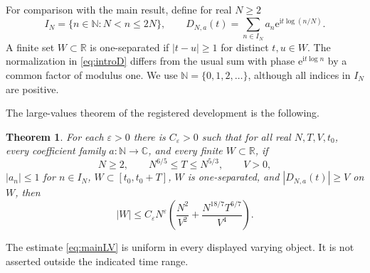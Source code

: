 \documentclass[11pt,a4paper,oneside]{article}
\newtheorem{theorem}{Theorem}[section]
\theoremstyle{definition}
\newcommand{\R}{\mathbb R}
\newcommand{\C}{\mathbb C}
\newcommand{\N}{\mathbb N}
\newcommand{\eps}{\varepsilon}
\newcommand{\ii}{\mathrm i}
\newcommand{\e}{\mathrm e}
\numberwithin{equation}{section}
\begin{document}
For comparison with the main result, define for real $N\ge2$
\begin{equation}\label{eq:introD}
 I_N=\{n\in\N:N<n\le2N\},\qquad
 D_{N,a}(t)=\sum_{n\in I_N}a_n\e^{\ii t\log(n/N)}.
\end{equation}
A finite set $W\subset\R$ is one-separated if $|t-u|\ge1$ for distinct $t,u\in W$. The normalization in \eqref{eq:introD} differs from the usual sum with phase $\e^{\ii t\log n}$ by a common factor of modulus one. We use $\N=\{0,1,2,\ldots\}$, although all indices in $I_N$ are positive.

The large-values theorem of the registered development is the following.
\begin{theorem}\label{thm:middle}
For each $\eps>0$ there is $C_\eps>0$ such that for all real
$N,T,V,t_0$, every coefficient family $a:\N\to\C$, and every finite $W\subset\R$, if
\[
 N\ge2,\qquad N^{6/5}\le T\le N^{5/3},\qquad V>0,
\]
$|a_n|\le1$ for $n\in I_N$, $W\subset[t_0,t_0+T]$, $W$ is one-separated, and $|D_{N,a}(t)|\ge V$ on $W$, then
\begin{equation}\label{eq:mainLV}
 |W|\le C_\eps N^\eps
 \left(\frac{N^2}{V^2}+\frac{N^{18/7}T^{6/7}}{V^4}\right).
\end{equation}
\end{theorem}
The estimate \eqref{eq:mainLV} is uniform in every displayed varying object. It is not asserted outside the indicated time range.
\end{document}
